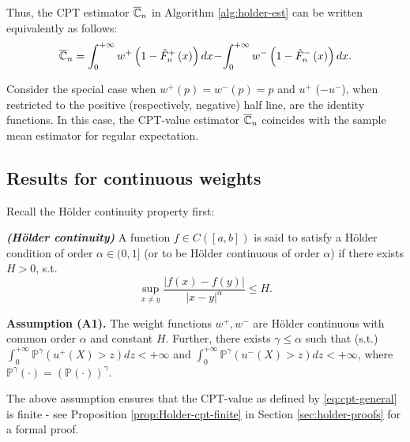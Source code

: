 Thus, the CPT estimator $\overline {\mathbb{C}}_n$ in Algorithm \ref{alg:holder-est} can be written equivalently as follows:
\begin{align}
\overline {\mathbb{C}}_n = \int_0^{+\infty} w^+\left(1-{\hat F_n}^+\left(x\right)\right)  dx \!-\! \int_0^{+\infty} w^-\left(1-{\hat F_n}^-\left(x\right)\right)  dx.
\label{eq:cpt-est-appendix}
\end{align}

Consider the special case when $w^+(p)=w^-(p)=p$ and $u^+$ ($-u^-$), when restricted to the positive (respectively, negative) half line, are the identity functions. In this case, the CPT-value estimator $\overline {\mathbb{C}}_n$ coincides with the sample mean estimator for regular expectation. 

\subsection{Results for \holder continuous weights}
Recall the H\"{o}lder continuity property first:
\begin{definition}\label{holder}
{\textbf{\textit{(H\"{o}lder continuity)}}}
A function $f \in C([a,b])$ is said to satisfy
a H\"{o}lder condition of order $\alpha\in (0,1]$ (or to be H\"{o}lder continuous
of order $\alpha$) if there exists $ H>0$, s.t.
\[
\sup_{x \neq y} \frac{| f(x) - f(y) |}{| x-y |^{\alpha}} \leq H .
\]
\end{definition}

\noindent\textbf{Assumption (A1).}  
The weight functions $w^+, w^-$ are H\"{o}lder continuous with common order $\alpha$ and constant $H$. Further,
there exists $ \gamma \le \alpha$ such that (s.t.)
$\int_0^{+\infty} \mathbb{P}^{\gamma} (u^+(X)>z) dz < +\infty$ and $\int_0^{+\infty} \mathbb{P}^{\gamma} (u^-(X)>z) dz < +\infty$,
where $\mathbb{P}^{\gamma}(\cdot) = \left(\mathbb{P}(\cdot)\right)^{\gamma}$.

The above assumption ensures that the CPT-value as defined by \eqref{eq:cpt-general} is finite - see Proposition 
\ref{prop:Holder-cpt-finite} in Section \ref{sec:holder-proofs} for a formal proof.




